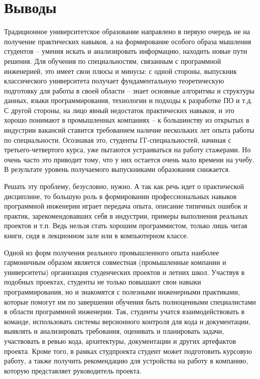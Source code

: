 \documentclass[a5paper]{article}
\begin{document}
\section{Выводы} 

Традиционное университетское образование направлено в первую очередь не на получение практических навыков, а на формирование особого образа мышления студентов -- умения искать и анализировать информацию, находить новые пути решения. Для обучения по специальностям, связанным с программной инженерией, это имеет свои плюсы и минусы: с одной стороны, выпускник классического университета получает фундаментальную теоретическую подготовку для работы в своей области -- знает основные алгоритмы и структуры данных, языки программирования, технологии и подходы к разработке ПО и т.д. С другой стороны, на лицо явный недостаток практических навыков, и это хорошо понимают в промышленных компаниях -- к большинству из открытых в индустрии вакансий ставится требованием наличие нескольких лет опыта работы по специальности. Осознавая это, студенты IT-специальностей, начиная с третьего-четвертого курса, уже пытаются устраиваться на работу стажерами. Но очень часто это приводит тому, что у них остается очень мало времени на учебу. В результате уровень получаемого выпускниками образования снижается.

Решать эту проблему, безусловно, нужно. А так как речь идет о практической дисциплине, то большую роль в формировании профессиональных навыков программной инженерии играет передача опыта, описание типичных ошибок и практик, зарекомендовавших себя в индустрии, примеры выполнения реальных проектов и т.п. Ведь нельзя стать хорошим программистом, только лишь читая книги, сидя в лекционном зале или в компьютерном классе. 

Одной из форм получения реального промышленного опыта наиболее гармоничным образом является совместная (промышленные компании и университеты) организация студенческих проектов и летних школ. Участвуя в подобных проектах, студенты не только повышают свои навыки программирования, но и знакомятся с полезными инженерными практиками, которые помогут им по завершении обучения быть полноценными специалистами в области программной инженерии. Так, студенты учатся взаимодействовать в команде, использовать системы версионного контроля для кода и документации, выявлять и анализировать требования, оценивать и планировать задачи, участвовать в ревью кода, архитектуры, документации и других артефактов проекта. Кроме того, в рамках студпроекта студент может подготовить курсовую работу, а также получить рекомендацию для устройства на работу в компанию, которую представляет руководитель проекта. 
\end{document}

